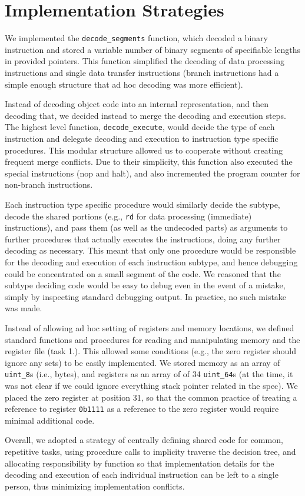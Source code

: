 \documentclass[11pt]{article}
\begin{document}
\section{Implementation Strategies}

We implemented the \verb|decode_segments| function, which decoded a binary instruction
and stored a variable number of binary segments of specifiable lengths in provided pointers.
This function simplified the decoding of data processing instructions and single data transfer
instructions (branch instructions had a simple enough structure that ad hoc decoding was more
efficient).

Instead of decoding object code into an internal representation, and then decoding that,
we decided instead to merge the decoding and execution steps. The highest level function,
\verb|decode_execute|, would decide the type of each instruction and delegate decoding and
execution to instruction type specific procedures. This modular structure allowed us to
cooperate without creating frequent merge conflicts. Due to their simplicity, this function
also executed the special instructions (nop and halt), and also incremented the program
counter for non-branch instructions.

Each instruction type specific procedure would similarly decide the subtype, decode the
shared portions (e.g., \verb|rd| for data processing (immediate) instructions),
and pass them (as well as the undecoded parts) as arguments to further procedures that 
actually executes the instructions, doing any further decoding as necessary. This meant
that only one procedure would be responsible for the decoding and execution of each
instruction subtype, and hence debugging could be concentrated on a small segment of the code.
We reasoned that the subtype deciding code would be easy to debug even in the event of
a mistake, simply by inspecting standard debugging output. In practice, no such mistake
was made.

Instead of allowing ad hoc setting of registers and memory locations, we defined standard
functions and procedures for reading and manipulating memory and the register file (task 1.).
This allowed some conditions (e.g., the zero register should ignore any sets) to be easily
implemented. We stored memory as an array of \verb|uint_8|s (i.e., bytes), and registers
as an array of of 34 \verb|uint_64|s (at the time, it was not clear if we could ignore
everything stack pointer related in the spec). We placed the zero register at position 31,
so that the common practice of treating a reference to register \verb|0b1111| as a reference
to the zero register would require minimal additional code.

Overall, we adopted a strategy of centrally defining shared code for common, repetitive tasks,
using procedure calls to implicity traverse the decision tree, and allocating responsibility
by function so that implementation details for the decoding and execution of each individual
instruction can be left to a single person, thus minimizing implementation conflicts.
\end{document}
